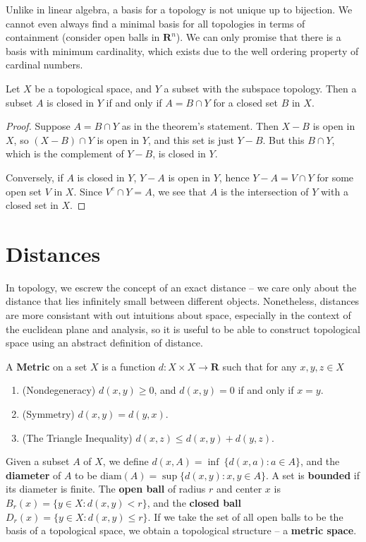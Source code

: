 \begin{example}
Unlike in linear algebra, a basis for a topology is not unique up to bijection. We cannot even always find a minimal basis for all topologies in terms of containment (consider open balls in $\mathbf{R}^n$). We can only promise that there is a basis with minimum cardinality, which exists due to the well ordering property of cardinal numbers.

\begin{theorem}
    Let $X$ be a topological space, and $Y$ a subset with the subspace topology. Then a subset $A$ is closed in $Y$ if and only if $A = B \cap Y$ for a closed set $B$ in $X$.
\end{theorem}
\begin{proof}
    Suppose $A = B \cap Y$ as in the theorem's statement. Then $X - B$ is open in $X$, so $(X - B) \cap Y$ is open in $Y$, and this set is just $Y - B$. But this $B \cap Y$, which is the complement of $Y - B$, is closed in $Y$.

    Conversely, if $A$ is closed in $Y$, $Y - A$ is open in $Y$, hence $Y - A = V \cap Y$ for some open set $V$ in $X$. Since $V^c \cap Y = A$, we see that $A$ is the intersection of $Y$ with a closed set in $X$.
\end{proof}




\chapter{Distances}

In topology, we escrew the concept of an exact distance -- we care only about the distance that lies infinitely small between different objects. Nonetheless, distances are more consistant with out intuitions about space, especially in the context of the euclidean plane and analysis, so it is useful to be able to construct topological space using an abstract definition of distance.

\begin{definition}
    A {\bf Metric} on a set $X$ is a function $d: X \times X \to \mathbf{R}$ such that for any $x,y,z \in X$
    \begin{enumerate}
        \item (Nondegeneracy) $d(x,y) \geq 0$, and $d(x,y) = 0$ if and only if $x = y$.
        \item (Symmetry) $d(x,y) = d(y,x)$.
        \item (The Triangle Inequality) $d(x,z) \leq d(x,y) + d(y,z)$.
    \end{enumerate}
    Given a subset $A$ of $X$, we define $d(x,A) = \inf\ \{ d(x,a) : a \in A \}$, and the {\bf diameter} of $A$ to be $\text{diam}(A) = \sup \{ d(x,y) : x,y \in A \}$. A set is {\bf bounded} if its diameter is finite. The {\bf open ball} of radius $r$ and center $x$ is $B_r(x) = \{ y \in X : d(x,y) < r \}$, and the {\bf closed ball} $D_r(x) = \{ y \in X : d(x,y) \leq r \}$. If we take the set of all open balls to be the basis of a topological space, we obtain a topological structure -- a {\bf metric space}.
\end{definition}


\end{example}
